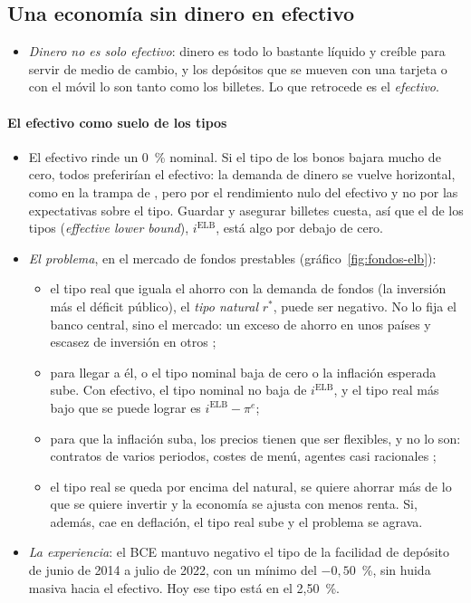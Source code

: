 \documentclass[11pt]{article}
\begin{document}
\subsection{Una economía sin dinero en efectivo}\label{sec:sin-efectivo}

\begin{itemize}
\item \emph{Dinero no es solo efectivo}: dinero es todo lo bastante líquido y creíble para servir de medio de cambio, y los depósitos que se mueven con una tarjeta o con el móvil lo son tanto como los billetes. Lo que retrocede es el \emph{efectivo}.
\end{itemize}

\paragraph{El efectivo como suelo de los tipos}

\begin{itemize}
\item El efectivo rinde un 0~\% nominal. Si el tipo de los bonos bajara mucho de cero, todos preferirían el efectivo: la demanda de dinero se vuelve horizontal, como en la trampa de , pero por el rendimiento nulo del efectivo y no por las expectativas sobre el tipo. Guardar y asegurar billetes cuesta, así que el  de los tipos (\emph{effective lower bound}), $i^{\mathrm{ELB}}$, está algo por debajo de cero.
\item \emph{El problema}, en el mercado de fondos prestables (gráfico~\ref{fig:fondos-elb}):
  \begin{itemize}
  \item el tipo real que iguala el ahorro con la demanda de fondos (la inversión más el déficit público), el \emph{tipo natural} $r^*$, puede ser negativo. No lo fija el banco central, sino el mercado: un exceso de ahorro en unos países y escasez de inversión en otros ;
  \item para llegar a él, o el tipo nominal baja de cero o la inflación esperada sube. Con efectivo, el tipo nominal no baja de $i^{\mathrm{ELB}}$, y el tipo real más bajo que se puede lograr es $i^{\mathrm{ELB}}-\pi^e$;
  \item para que la inflación suba, los precios tienen que ser flexibles, y no lo son: contratos de varios periodos, costes de menú, agentes casi racionales ;
  \item el tipo real se queda por encima del natural, se quiere ahorrar más de lo que se quiere invertir y la economía se ajusta con menos renta. Si, además, cae en deflación, el tipo real sube y el problema se agrava.
  \end{itemize}
\item \emph{La experiencia}: el BCE mantuvo negativo el tipo de la facilidad de depósito de junio de 2014 a julio de 2022, con un mínimo del $-0{,}50$~\%\nocite{BCE2026Tipos}, sin huida masiva hacia el efectivo. Hoy ese tipo está en el 2,50~\%.
\end{itemize}
\end{document}
